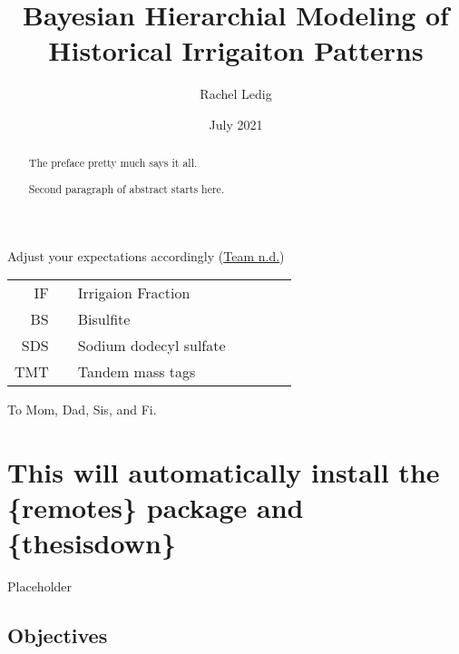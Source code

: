 \documentclass[12pt,twoside]{reedthesis}
\title{Bayesian Hierarchial Modeling of Historical Irrigaiton Patterns}
\author{Rachel Ledig}
\date{July 2021}
\begin{document}
  \maketitle

\frontmatter %
\pagestyle{empty} %
  \begin{acknowledgements}
    Adjust your expectations accordingly (\protect\hyperlink{ref-teamStanReferenceManual}{Team n.d.})
  \end{acknowledgements}

  \hypersetup{linkcolor=black}
  \setcounter{secnumdepth}{2}
  \setcounter{tocdepth}{2}
  \tableofcontents


  \listoftables

  \listoffigures
  \begin{abbreviations}
    \begin{tabular}{rp{0.2cm}lp{1cm}rp{0.2cm}l} IF & &  Irrigaion Fraction \\ BS  & &  Bisulfite \\ SDS  & &  Sodium dodecyl sulfate  \\ TMT  & & Tandem mass tags \\ \end{tabular}
  \end{abbreviations}
  \begin{abstract}
    The preface pretty much says it all.

    \par

    Second paragraph of abstract starts here.
  \end{abstract}
  \begin{dedication}
    To Mom, Dad, Sis, and Fi.
  \end{dedication}
\mainmatter %
\pagestyle{fancyplain} %

\hypertarget{this-will-automatically-install-the-remotes-package-and-thesisdown}{%
\chapter{This will automatically install the \{remotes\} package and \{thesisdown\}}\label{this-will-automatically-install-the-remotes-package-and-thesisdown}}

Placeholder

\hypertarget{objectives}{%
\section{Objectives}\label{objectives}}
\end{document}
